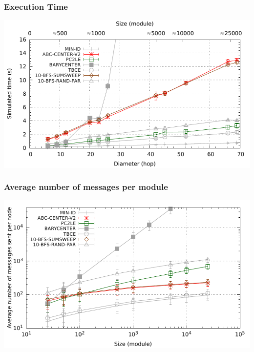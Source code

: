 \begin{frame} \frametitle{Execution Time}

\begin{center}
	\includegraphics[width=0.9\linewidth]{fig/centrality/time}
\end{center}
\end{frame}


\begin{frame} \frametitle{Average number of messages per module}
\begin{center}
	\includegraphics[width=0.9\linewidth]{fig/centrality/avgMessages}
\end{center}

\end{frame}


